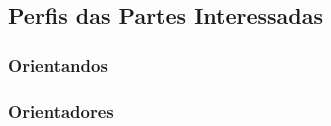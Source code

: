 \begin{anexosenv}
	\subsection{Perfis das Partes Interessadas}

	\subsubsection{Orientandos}


	\subsubsection{Orientadores}


\end{anexosenv}
